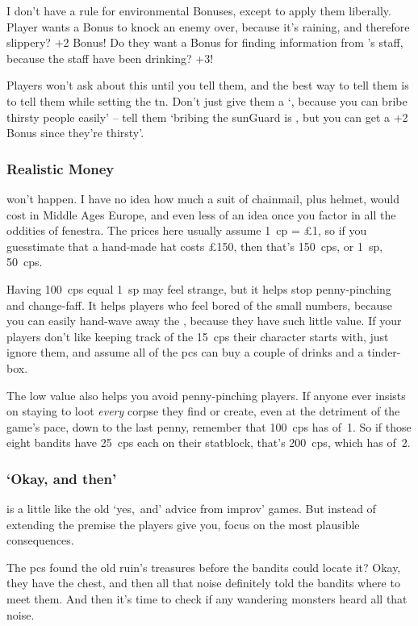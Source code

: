 \begin{multicols}{2}
I don't have a rule for environmental Bonuses, except to apply them liberally.
Player wants a Bonus to knock an enemy over, because it's raining, and therefore slippery?
+2 Bonus!
Do they want a Bonus for finding information from 's staff, because the staff have been drinking?
+3!

Players won't ask about this until you tell them, and the best way to tell them is to tell them while setting the \gls{tn}.
Don't just give them a `\tn[8], because you can bribe thirsty people easily' -- tell them `bribing the \gls{sunGuard} is \tn[10], but you can get a +2 Bonus since they're thirsty'.

\subsubsection{Realistic Money}
won't happen.
I have no idea how much a suit of chainmail, plus helmet, would cost in Middle Ages Europe, and even less of an idea once you factor in all the oddities of \gls{fenestra}.
The prices here usually assume 1~\gls{cp} = \pounds1, so if you guesstimate that a hand-made hat costs \pounds150, then that's 150~\glspl{cp}, or 1~\gls{sp}, 50~\glspl{cp}.

Having 100~\glspl{cp} equal 1~\gls{sp} may feel strange, but it helps stop penny-pinching and change-faff.
It helps players who feel bored of the small numbers, because you can easily hand-wave away the , because they have such little value.
If your players don't like keeping track of the 15~\glspl{cp} their character starts with, just ignore them, and assume all of the \glspl{pc} can buy a couple of drinks and a tinder-box.

The low value also helps you avoid penny-pinching players.
If anyone ever insists on staying to loot \emph{every} corpse they find or create, even at the detriment of the game's pace, down to the last penny, remember that 100~\glspl{cp} has  of~1.
So if those eight bandits have 25~\glspl{cp} each on their statblock, that's 200~\glspl{cp}, which has  of~2.

\subsubsection{`Okay, and then'}
is a little like the old `yes,~and' advice from improv' games.
But instead of extending the premise the players give you, focus on the most plausible consequences.

The \glspl{pc} found the old ruin's treasures before the bandits could locate it?
Okay, they have the chest, and then all that noise definitely told the bandits where to meet them.
And then it's time to check if any wandering \glspl{monster} heard all that noise.


\end{multicols}
